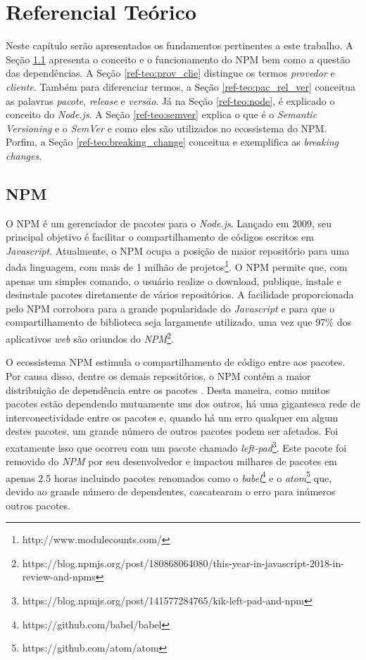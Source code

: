 \chapter{Referencial Teórico}
\label{cap:ref-teorico}
Neste capítulo serão apresentados os fundamentos pertinentes a este trabalho. A Seção \ref{ref-teo:npm} apresenta o conceito e o funcionamento do \gls{NPM} bem como a questão das dependências. A Seção \ref{ref-teo:prov_clie} distingue os termos \textit{provedor} e \textit{cliente}. Também para diferenciar termos, a Seção \ref{ref-teo:pac_rel_ver} conceitua as palavras \textit{pacote}, \textit{release} e \textit{versão}. Já na Seção \ref{ref-teo:node}, é explicado o conceito do \textit{Node.js}. A Seção \ref{ref-teo:semver} explica o que é o \textit{Semantic Versioning} e o \textit{SemVer} e como eles são utilizados no ecossistema do \gls{NPM}. Porfim, a Seção \ref{ref-teo:breaking_change} conceitua e exemplifica as \textit{breaking changes}.

\section{\gls{NPM}}
\label{ref-teo:npm}
O \gls{NPM} é um gerenciador de pacotes para o \textit{Node.js}. Lançado em 2009, seu principal objetivo é facilitar o compartilhamento de códigos escritos em \textit{Javascript}. Atualmente, o \gls{NPM} ocupa a posição de maior repositório para uma dada linguagem, com mais de 1 milhão de projetos\footnote{http://www.modulecounts.com/}. O \gls{NPM} permite que, com apenas um simples comando, o usuário realize o download, publique, instale e desinstale pacotes diretamente de vários repositórios. A facilidade proporcionada pelo \gls{NPM} corrobora para a grande popularidade do \textit{Javascript} e para que o compartilhamento de biblioteca seja largamente utilizado, uma vez que 97\% dos aplicativos \textit{web} são oriundos do \textit{NPM}\footnote{https://blog.npmjs.org/post/180868064080/this-year-in-javascript-2018-in-review-and-npms}.

O ecossistema \gls{NPM} estimula o compartilhamento de código entre aos pacotes. Por causa disso, dentre os demais repositórios, o \gls{NPM} contém a maior distribuição de dependência entre os pacotes \cite{teorical_reference:npm_2}. Desta maneira, como muitos pacotes estão dependendo mutuamente uns dos outros, há uma gigantesca rede de interconectividade entre os pacotes e, quando há um erro qualquer em algum destes pacotes, um grande número de outros pacotes podem ser afetados. Foi exatamente isso que ocorreu com um pacote chamado \textit{left-pad}\footnote{https://blog.npmjs.org/post/141577284765/kik-left-pad-and-npm}. Este pacote foi removido do \textit{NPM} por seu desenvolvedor e impactou milhares de pacotes em apenas 2.5 horas incluindo pacotes renomados como o \textit{babel}\footnote{https://github.com/babel/babel} e o \textit{atom}\footnote{https://github.com/atom/atom} que, devido ao grande número de dependentes, cascatearam o erro para inúmeros outros pacotes.

